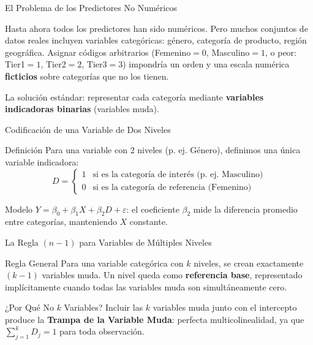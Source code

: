 \documentclass[10pt, aspectratio=169]{beamer}
\begin{document}
\begin{frame}{El Problema de los Predictores No Numéricos}
  \footnotesize
  \begin{motivacion}
    Hasta ahora todos los predictores han sido numéricos. Pero muchos conjuntos de datos reales incluyen variables categóricas: género, categoría de producto, región geográfica. Asignar códigos arbitrarios (Femenino$=0$, Masculino$=1$, o peor: Tier1$=1$, Tier2$=2$, Tier3$=3$) impondría un orden y una escala numérica \textbf{ficticios} sobre categorías que no los tienen.
  \end{motivacion}

  \vspace{0.15cm}
  \pause
  La solución estándar: representar cada categoría mediante \textbf{variables indicadoras binarias} (variables muda).
\end{frame}

\begin{frame}{Codificación de una Variable de Dos Niveles}
  \footnotesize
  \begin{block}{Definición}
    Para una variable con 2 niveles (p. ej. Género), definimos una única variable indicadora:
    $$D=\begin{cases}1 & \text{si es la categoría de interés (p. ej. Masculino)}\\0 & \text{si es la categoría de referencia (Femenino)}\end{cases}$$
  \end{block}
  \pause

  \vspace{0.1cm}
  \begin{alertblock}{Modelo}
    $Y=\beta_0+\beta_1X+\beta_2D+\varepsilon$: el coeficiente $\beta_2$ mide la diferencia promedio entre categorías, manteniendo $X$ constante.
  \end{alertblock}
\end{frame}

\begin{frame}{La Regla $(n-1)$ para Variables de Múltiples Niveles}
  \footnotesize
  \begin{block}{Regla General}
    Para una variable categórica con $k$ niveles, se crean exactamente $(k-1)$ variables muda. Un nivel queda como \textbf{referencia base}, representado implícitamente cuando todas las variables muda son simultáneamente cero.
  \end{block}
  \pause

  \vspace{0.1cm}
  \begin{alertblock}{¿Por Qué No $k$ Variables?}
    Incluir las $k$ variables muda junto con el intercepto produce la \textbf{Trampa de la Variable Muda}: perfecta multicolinealidad, ya que $\sum_{j=1}^kD_j=1$ para toda observación.
  \end{alertblock}
\end{frame}
\end{document}
